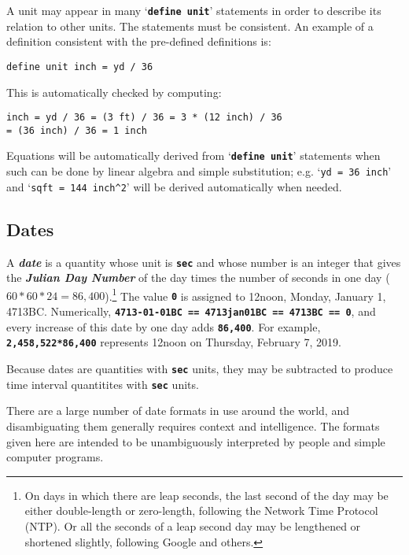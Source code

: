 \documentclass[12pt]{article}
\newcommand{\TT}[1]{{\tt \bfseries #1}}
\newcommand{\key}[1]{{\bf \em #1}\index{#1}}
\newcommand{\CIRCUM}{\textasciicircum}
\newenvironment{indpar}[1][0.3in]%
	{\begin{list}{}%
		     {\setlength{\itemsep}{0in}%
		      \setlength{\topsep}{0in}%
		      \setlength{\parsep}{1ex}%
		      \setlength{\labelwidth}{#1}%
		      \setlength{\leftmargin}{#1}%
		      \addtolength{\leftmargin}{\labelsep}}%
	 \item}%
	{\end{list}}
\begin{document}
A unit may appear in many `\TT{define unit}' statements in order to describe
its relation to other units.  The statements must be consistent.
An example of a definition consistent with the pre-defined
definitions is:

\begin{indpar}\begin{verbatim}
define unit inch = yd / 36
\end{verbatim}\end{indpar}

This is automatically checked by computing:
\begin{center}
\tt inch = yd / 36 = (3 ft) / 36 = 3 * (12 inch) / 36 \\
= (36 inch) / 36 = 1 inch
\end{center}

Equations will be automatically derived from `\TT{define unit}' statements
when such can be done by linear algebra and simple substitution; e.g.
`{\tt yd = 36 inch}' and `{\tt sqft = 144 inch\CIRCUM 2}'
will be derived automatically when needed.



\subsection{Dates}
\label{DATES}

A \key{date} is a quantity whose unit is \TT{sec}
and whose number is an integer
that gives the \key{Julian Day Number} of the day times
the number of seconds in one day ($60*60*24=86,400$).\footnote{
On days in which there are leap seconds, the last second of the
day may be either double-length or zero-length, following the Network
Time Protocol (NTP).  Or all the seconds of a leap second day may be
lengthened or shortened slightly, following Google and others.}
The value \TT{0} is assigned to
12noon, Monday, January 1, 4713BC.
Numerically, \TT{4713-01-01BC == 4713jan01BC == 4713BC == 0}, and every increase
of this date by one day adds \TT{86,400}.  For example,
\TT{2,458,522*86,400} represents
12noon on Thursday, February 7, 2019.

Because dates are quantities with \TT{sec} units, they may be subtracted to
produce time interval quantitites with \TT{sec} units.

There are a large number of date formats in use around the world,
and disambiguating them generally requires context and intelligence.
The formats given here are intended to be unambiguously interpreted
by people and simple computer programs.
\end{document}
